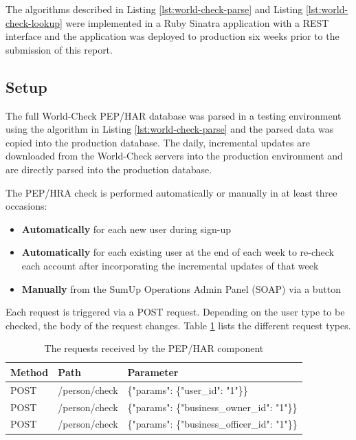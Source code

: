 \documentclass[a4paper, oneside]{csthesis}
\begin{document}
The algorithms described in Listing \ref{lst:world-check-parse} and Listing \ref{lst:world-check-lookup} were implemented in a Ruby Sinatra application with a REST interface and the application was deployed to production six weeks prior to the submission of this report.

\subsection{Setup}

The full World-Check PEP/HAR database was parsed in a testing environment using the algorithm in Listing \ref{lst:world-check-parse} and the parsed data was copied into the production database. The daily, incremental updates are downloaded from the World-Check servers into the production environment and are directly parsed into the production database.

The PEP/HRA check is performed automatically or manually in at least three occasions:
\begin{itemize}
\item \textbf{Automatically} for each new user during sign-up
\item \textbf{Automatically} for each existing user at the end of each week to re-check each account after incorporating the incremental updates of that week
\item \textbf{Manually} from the SumUp Operations Admin Panel (SOAP) via a button
\end{itemize}

Each request is triggered via a POST request. Depending on the user type to be checked, the body of the request changes. Table \ref{tbl:har-pep-requests} lists the different request types.

\begin{table}[tb]
    \begin{center}
        \begin{tabular}{p{1.75cm}|p{3cm}p{7cm}}
        \hline
        \textbf{Method} & \textbf{Path} & \textbf{Parameter} \\
        \hline
        POST & /person/check & \{"params": \{"user\_id": "1"\}\} \\ \hdashline[0.5pt/3pt]
        POST & /person/check & \{"params": \{"business\_owner\_id": "1"\}\} \\ \hdashline[0.5pt/3pt]
        POST & /person/check & \{"params": \{"business\_officer\_id": "1"\}\} \\
        \hline
        \end{tabular}
    \end{center}
    \caption{The requests received by the PEP/HAR component}
    \label{tbl:har-pep-requests}
\end{table}
\end{document}
